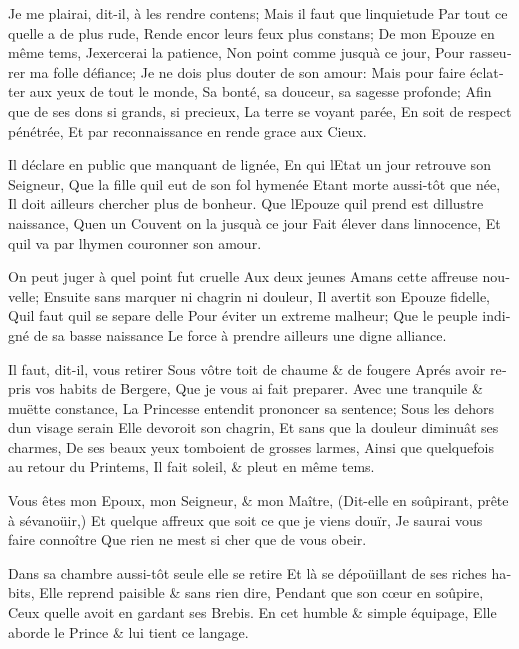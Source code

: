 \documentclass[14pt,a4paper]{memoir}
\begin{document}
\begin{otherlanguage}{french}
{Je me plairai, dit-il, à les rendre contens;} {Mais il faut que
l\textquotesingle inquietude} {Par tout ce qu\textquotesingle elle a de
plus rude,} {Rende encor leurs feux plus constans;} {De mon Epouze en
même tems,} {J\textquotesingle exercerai la patience,} {Non point comme
jusqu\textquotesingle à ce jour,} {Pour rasseurer ma folle défiance;}
{Je ne dois plus douter de son amour:} {Mais pour faire éclatter aux
yeux de tout le monde,} {Sa bonté, sa douceur, sa sagesse profonde;}
{Afin que de ses dons si grands, si precieux,} {La terre se voyant
parée,} {En soit de respect pénétrée,} {Et par reconnaissance en rende
grace aux Cieux. }

{Il déclare en public que manquant de lignée,} {En qui
l\textquotesingle Etat un jour retrouve son Seigneur,} {Que la fille
qu\textquotesingle il eut de son fol hymenée} {Etant morte aussi-tôt que
née,} {Il doit ailleurs chercher plus de bonheur.} {Que
l\textquotesingle Epouze qu\textquotesingle il prend est
d\textquotesingle illustre naissance,} {Qu\textquotesingle en un Couvent
on l\textquotesingle a jusqu\textquotesingle à ce jour} {Fait élever
dans l\textquotesingle innocence,} {Et qu\textquotesingle il va par
l\textquotesingle hymen couronner son amour.}

{On peut juger à quel point fut cruelle} {Aux deux jeunes Amans cette
affreuse nouvelle;} {Ensuite sans marquer ni chagrin ni douleur,} {Il
avertit son Epouze fidelle,} {Qu\textquotesingle il faut
qu\textquotesingle il se separe d\textquotesingle elle} {Pour éviter un
extreme malheur;} {Que le peuple indigné de sa basse naissance} {Le
force à prendre ailleurs une digne alliance. }

{Il faut, dit-il, vous retirer} {Sous vôtre toit de chaume \& de
fougere} {Aprés avoir repris vos habits de Bergere,} {Que je vous ai
fait preparer.} {Avec une tranquile \& muëtte constance,} {La Princesse
entendit prononcer sa sentence;} {Sous les dehors d\textquotesingle un
visage serain} {Elle devoroit son chagrin,} {Et sans que la douleur
diminuât ses charmes,} {De ses beaux yeux tomboient de grosses larmes,}
{Ainsi que quelquefois au retour du Printems,} {Il fait soleil, \& pleut
en même tems.}

{Vous êtes mon Epoux, mon Seigneur, \& mon Maître,} {(Dit-elle en
soûpirant, prête à s\textquotesingle évanoüir,)} {Et quelque affreux que
soit ce que je viens d\textquotesingle ouïr,} {Je saurai vous faire
connoître} {Que rien ne m\textquotesingle est si cher que de vous
obeir.}

{Dans sa chambre aussi-tôt seule elle se retire} {Et là se dépoüillant
de ses riches habits,} {Elle reprend paisible \& sans rien dire,}
{Pendant que son cœur en soûpire,} {Ceux qu\textquotesingle elle avoit
en gardant ses Brebis.} {En cet humble \& simple équipage,} {Elle aborde
le Prince \& lui tient ce langage. }


\end{otherlanguage}
\end{document}
